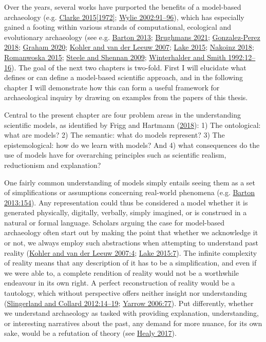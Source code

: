 \documentclass[
  12pt,
  a4paper,
  oneside]{book}
\begin{document}
Over the years, several works have purported the benefits of a model-based archaeology (e.g. \protect\hyperlink{ref-clarke1972}{Clarke 2015{[}1972{]}}; \protect\hyperlink{ref-wylie2002}{Wylie 2002:91--96}), which has especially gained a footing within various strands of computational, ecological and evolutionary archaeology (see e.g. \protect\hyperlink{ref-barton2013}{Barton 2013}; \protect\hyperlink{ref-brughmans2021}{Brughmans 2021}; \protect\hyperlink{ref-gonzalez-perez2018}{Gonzalez-Perez 2018}; \protect\hyperlink{ref-graham2020}{Graham 2020}; \protect\hyperlink{ref-kohler2007}{Kohler and van der Leeuw 2007}; \protect\hyperlink{ref-lake2015}{Lake 2015}; \protect\hyperlink{ref-nakoinz2018}{Nakoinz 2018}; \protect\hyperlink{ref-romanowska2015}{Romanwoska 2015}; \protect\hyperlink{ref-steele2009}{Steele and Shennan 2009}; \protect\hyperlink{ref-winterhalder1992}{Winterhalder and Smith 1992:12--16}). The goal of the next two chapters is two-fold. First I will elucidate what defines or can define a model-based scientific approach, and in the following chapter I will demonstrate how this can form a useful framework for archaeological inquiry by drawing on examples from the papers of this thesis.

Central to the present chapter are four problem areas in the understanding scientific models, as identified by Frigg and Hartmann (\protect\hyperlink{ref-frigg2018}{2018}): 1) The ontological: what are models? 2) The semantic: what do models represent? 3) The epistemological: how do we learn with models? And 4) what consequences do the use of models have for overarching principles such as scientific realism, reductionism and explanation?

One fairly common understanding of models simply entails seeing them as a set of simplifications or assumptions concerning real-world phenomena (e.g. \protect\hyperlink{ref-barton2013}{Barton 2013:154}). Any representation could thus be considered a model whether it is generated physically, digitally, verbally, simply imagined, or is construed in a natural or formal language. Scholars arguing the case for model-based archaeology often start out by making the point that whether we acknowledge it or not, we always employ such abstractions when attempting to understand past reality (\protect\hyperlink{ref-kohler2007}{Kohler and van der Leeuw 2007:4}; \protect\hyperlink{ref-lake2015}{Lake 2015:7}). The infinite complexity of reality means that any description of it has to be a simplification, and even if we were able to, a complete rendition of reality would not be a worthwhile endeavour in its own right. A perfect reconstruction of reality would be a tautology, which without perspective offers neither insight nor understanding (\protect\hyperlink{ref-slingerland2012}{Slingerland and Collard 2012:14--19}; \protect\hyperlink{ref-yarrow2006}{Yarrow 2006:77}). Put differently, whether we understand archaeology as tasked with providing explanation, understanding, or interesting narratives about the past, any demand for more nuance, for its own sake, would be a refutation of theory (see \protect\hyperlink{ref-healy2017}{Healy 2017}).
\end{document}
